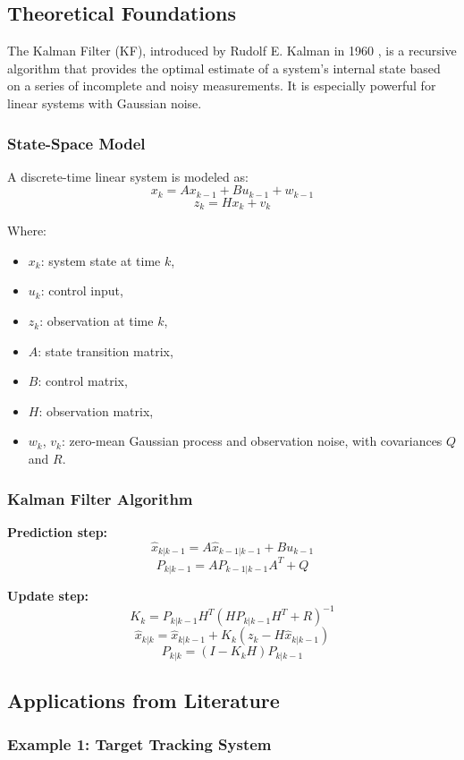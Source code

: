 \documentclass[a4paper]{article}
\begin{document}
\subsection{Theoretical Foundations}

The Kalman Filter (KF), introduced by Rudolf E. Kalman in 1960 \parencite{kalman1960new}, is a recursive 
algorithm that provides the optimal estimate of a system’s internal state based on a series of incomplete and 
noisy measurements. It is especially powerful for linear systems with Gaussian noise.

\subsubsection*{State-Space Model}

A discrete-time linear system is modeled as:
\[
x_k = A x_{k-1} + B u_{k-1} + w_{k-1}
\]
\[
z_k = H x_k + v_k
\]

Where:
\begin{itemize}
  \item $x_k$: system state at time $k$,
  \item $u_k$: control input,
  \item $z_k$: observation at time $k$,
  \item $A$: state transition matrix,
  \item $B$: control matrix,
  \item $H$: observation matrix,
  \item $w_k$, $v_k$: zero-mean Gaussian process and observation noise, with covariances $Q$ and $R$.
\end{itemize}

\subsubsection*{Kalman Filter Algorithm}

\textbf{Prediction step:}
\[
\hat{x}_{k|k-1} = A \hat{x}_{k-1|k-1} + B u_{k-1}
\]
\[
P_{k|k-1} = A P_{k-1|k-1} A^T + Q
\]

\textbf{Update step:}
\[
K_k = P_{k|k-1} H^T (H P_{k|k-1} H^T + R)^{-1}
\]
\[
\hat{x}_{k|k} = \hat{x}_{k|k-1} + K_k (z_k - H \hat{x}_{k|k-1})
\]
\[
P_{k|k} = (I - K_k H) P_{k|k-1}
\]

\subsection{Applications from Literature}

\subsubsection*{Example 1: Target Tracking System}
\end{document}
